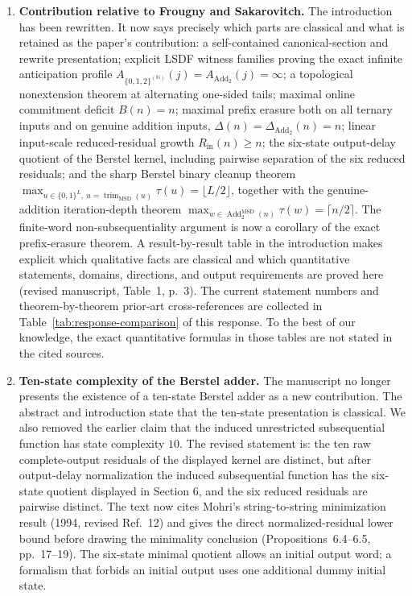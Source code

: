 \documentclass[11pt]{article}
\begin{document}
\begin{enumerate}[leftmargin=*]
\item \textbf{Contribution relative to Frougny and Sakarovitch.}
The introduction has been rewritten.  It now says precisely which parts are
classical and what is retained as the paper's contribution: a self-contained
canonical-section and rewrite presentation; explicit LSDF witness families
proving the exact infinite anticipation profile
$A_{\{0,1,2\}^{(\mathbb N)}}(j)=A_{\operatorname{Add}_2}(j)=\infty$; a
topological nonextension theorem at alternating one-sided tails; maximal
online commitment deficit $B(n)=n$; maximal prefix erasure both on all ternary
inputs and on genuine addition inputs,
$\Delta(n)=\Delta_{\operatorname{Add}_2}(n)=n$; linear input-scale
reduced-residual growth $R_{\mathrm{in}}(n)\ge n$; the six-state output-delay quotient of the Berstel kernel,
including pairwise separation of the six reduced residuals; and the sharp
Berstel binary cleanup theorem
$\max_{u\in\{0,1\}^L,\ u=\operatorname{trim}_{\mathrm{MSD}}(u)}\tau(u)
=\lfloor L/2\rfloor$, together with the genuine-addition iteration-depth theorem
$\max_{w\in \operatorname{Add}_2^{\mathrm{MSD}}(n)}\tau(w)=\lceil n/2\rceil$.
The finite-word non-subsequentiality argument is now a corollary of the exact
prefix-erasure theorem.  A result-by-result table in the introduction makes
explicit which qualitative facts are classical and which quantitative
statements, domains, directions, and output requirements are proved here
(revised manuscript, Table~1, p.~3).  The current statement numbers and
theorem-by-theorem prior-art cross-references are collected in
Table~\ref{tab:response-comparison} of this response.  To the best of our
knowledge, the exact quantitative formulas in those tables are not stated in
the cited sources.

\item \textbf{Ten-state complexity of the Berstel adder.}
The manuscript no longer presents the existence of a ten-state Berstel adder
as a new contribution.  The abstract and introduction state that the
ten-state presentation is classical.  We also removed the earlier claim that
the induced unrestricted subsequential function has state complexity $10$.
The revised statement is: the ten raw complete-output residuals of the
displayed kernel are distinct, but after output-delay normalization the
induced subsequential function has the six-state quotient displayed in
Section 6, and the six reduced residuals are pairwise distinct.  The text now
cites Mohri's string-to-string minimization result (1994, revised Ref.~12)
and gives the direct normalized-residual lower bound before drawing the
minimality conclusion (Propositions~6.4--6.5, pp.~17--19).  The six-state
minimal quotient allows an initial output word; a formalism that forbids an
initial output uses one additional dummy initial state.


\end{enumerate}
\end{document}
